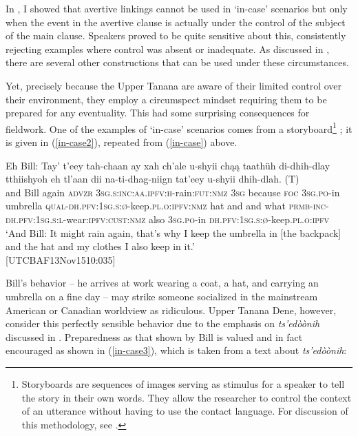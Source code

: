 \documentclass[output=paper,colorlinks,citecolor=brown
]{langscibook}
\begin{document}
In , I showed that avertive linkings cannot be used in `in-case' scenarios but only when the event in the avertive clause is actually under the control of the subject of the main clause. Speakers proved to be quite sensitive about this, consistently rejecting examples where control was absent or inadequate. As discussed in , there are several other constructions that can be used under these circumstances.

Yet, precisely because the Upper Tanana are aware of their limited control over their environment, they employ a circumspect mindset requiring them to be prepared for any eventuality. This had some surprising consequences for fieldwork. One of the examples of `in-case' scenarios  comes from a storyboard\footnote{Storyboards are sequences of images serving as stimulus for a speaker to tell the story in their own words. They allow the researcher to control the context of an utterance without having to use the contact language. For discussion of this methodology, see \citet{BurtonSMatthewsonL2015}.} \citep{vanderKlokJ2013}; it is given in (\ref{in-case2}), repeated from (\ref{in-case}) above.

\ea \label{in-case2}
\gll  Eh Bill: Tay' t'eey tah-chaan ay xah ch'ale  u-shyii {chąą taathüh} di-dhih-dlay tthiishyoh eh tl'aan dii na-ti-dhag-niign tat'eey u-shyii {dhih-dlah. \textnormal{(T)}} \\
and Bill again \textsc{advzr} \textsc{3sg.s:inc:aa.ipfv:h}-rain:\textsc{fut:nmz} \textsc{3sg} because \textsc{foc} \textsc{3sg.po}-in umbrella \textsc{qual-dh.pfv:1sg.s:ø}-keep.\textsc{pl.o:ipfv:nmz} hat and and what \textsc{prmb-inc-dh.pfv:1sg.s:l}-wear:\textsc{ipfv:cust:nmz} also \textsc{3sg.po}-in \textsc{dh.pfv:1sg.s:ø}-keep.\textsc{pl.o:ipfv} \\
\glt `And Bill: It might rain again, that's why I keep the umbrella in [the backpack] and the hat and my clothes I also keep in it.' \\ \hfill [UTCBAF13Nov1510:035]
\z

\noindent Bill's behavior -- he arrives at work wearing a coat, a hat, and carrying an umbrella on a fine day -- may strike someone socialized in the mainstream American or Canadian worldview as ridiculous.  Upper Tanana Dene, however, consider this perfectly sensible behavior due to the emphasis on \textit{ts'edòònih} discussed in . Preparedness as that shown by Bill is valued and in fact encouraged as shown in (\ref{in-case3}), which is taken from a text about \textit{ts'edòònih}:
 
\end{document}
